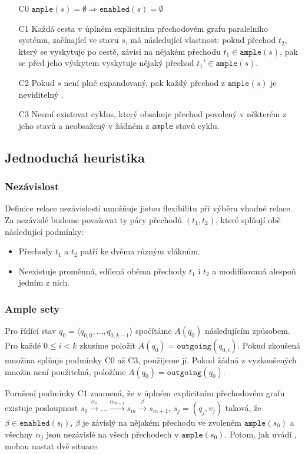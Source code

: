 \documentclass[10pt,a4paper,notitlepage]{report}
\newcommand{\tuple}[1]{\langle #1 \rangle}
\begin{document}
\begin{enumerate}
\item[C0] $\texttt{ample}(s) = \emptyset \Rightarrow \texttt{enabled}(s) = \emptyset$
\item[C1] Každá cesta v úplném explicitním přechodovém grafu paralelního systému, začínající ve stavu $s$, má následující vlastnost: pokud přechod $t_2$, který se vyskytuje po cestě, závisí na nějakém přechodu $t_1 \in \texttt{ample}(s)$, pak se před jeho výskytem vyskytuje nějaký přechod $t_1' \in \texttt{ample}(s)$.
\item[C2] Pokud $s$ není plně expandovaný, pak každý přechod z $\texttt{ample}(s)$ je neviditelný .
\item[C3] Nesmí existovat cyklus, který obsahuje přechod povolený v některém z jeho stavů a neobsažený v žádném z \texttt{ample} stavů cyklu.
\end{enumerate}


\subsection{Jednoduchá heuristika}
\subsubsection{Nezávislost}
Definice relace nezávislosti umožňuje jistou flexibilitu při výběru vhodné relace. Za nezávislé budeme považovat ty páry přechodů $(t_1, t_2)$, které splňují obě následující podmínky:
\begin{itemize}
\item Přechody $t_1$ a $t_2$ patří ke dvěma různým vláknům.
\item Neexistuje proměnná, sdílená oběma přechody $t_1$ i $t_2$ a modifikovaná alespoň jedním z nich.
\end{itemize}


\subsubsection{Ample sety}
Pro řídící stav $q_0 = \tuple{q_{0,0}, \ldots, q_{0,k-1}}$ spočítáme $A(q_0)$ následujícím způsobem. Pro každé $0 \leq i < k$ zkusíme položit $A(q_0) = \texttt{outgoing}(q_{0,i})$. Pokud zkoušená množina splňuje podmínky C0 až C3, použijeme jí. Pokud žádná z vyzkoušených množin není použitelná, položíme $A(q_0) = \texttt{outgoing}(q_0)$.

Porušení podmínky C1 \label{subsec:c1-violation} znamená, že v úplném explicitním přechodovém grafu existuje posloupnost $s_0 \xrightarrow{\alpha_0} \ldots \xrightarrow{\alpha_{m-1}} s_m \xrightarrow{\beta} s_{m+1}$, $s_j = (q_j, v_j)$ taková, že $\beta \in \texttt{enabled}(s_l)$, $\beta$ je závislý na nějakém přechodu ve zvoleném $\texttt{ample}(s_0)$ a všechny $\alpha_j$ jsou nezávislé na všech přechodech v $\texttt{ample}(s_0)$. Potom, jak uvádí \cite{CLARKE}, mohou nastat dvě situace.
\end{document}
